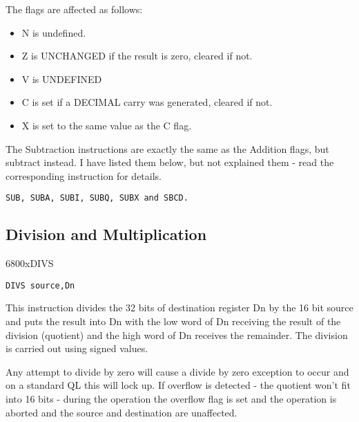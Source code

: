 The flags are affected as follows:
\begin{itemize}[itemsep=0pt]

\item{}N is undefined.


\item{}Z is UNCHANGED if the result is zero, cleared if not.


\item{}V is UNDEFINED


\item{}C is set if a DECIMAL carry was generated, cleared if
          not.


\item{}X is set to the same value as the C flag.

\end{itemize}

The Subtraction instructions are exactly the same as the Addition
      flags, but subtract instead. I have listed them below, but not explained
      them -{} read the corresponding  instruction for details.

\begin{lstlisting}[frame=none,numbers=none]
SUB, SUBA, SUBI, SUBQ, SUBX and SBCD.
\end{lstlisting}

\subsection{Division and Multiplication}
\label{ch3-division-multiplication}%
\mc6800x{DIVS}
\begin{lstlisting}[firstnumber=1,]
          DIVS source,Dn
\end{lstlisting}

This instruction divides the 32 bits of destination register Dn by the 16 bit source and puts the result
      into Dn with the low word of Dn receiving the result of the division (quotient) and the high word of Dn receives the remainder. The
      division is carried out using signed values. 

Any attempt to divide by zero will cause a divide by zero
      exception to occur and on a standard QL this will lock up. If overflow
      is detected - the quotient won't fit into 16 bits - during the operation the overflow flag is set and the
      operation is aborted and the source and destination are
      unaffected.


